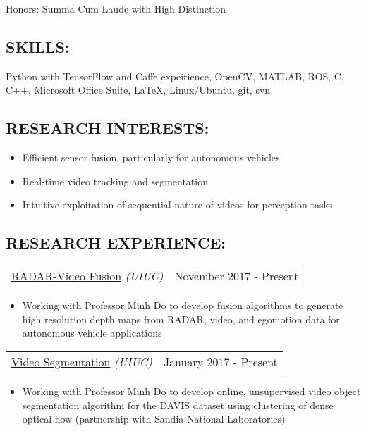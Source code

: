 \documentclass[10pt, letterpaper]{article}
\makeatletter
\newcommand{\headerrow}[2]
{\begin{tabular*}{\linewidth}{l@{\extracolsep{\fill}}r}
	#1 &
	#2 \\
\end{tabular*}}
\newcommand{\sansserif}{\cabin}
\makeatother
\begin{document}
Honors: Summa Cum Laude with High Distinction

\subsection*{\sansserif SKILLS:}
Python with TensorFlow and Caffe expeirience, OpenCV, MATLAB, ROS, C, C++,
	Microsoft Office Suite, \LaTeX, Linux/Ubuntu, git, svn

\subsection*{\sansserif RESEARCH INTERESTS:}
\begin{itemize}
	\item Efficient sensor fusion, particularly for autonomous vehicles
	\item Real-time video tracking and segmentation
	\item Intuitive exploitation of sequential nature of videos for perception tasks
\end{itemize}

\subsection*{\sansserif RESEARCH EXPERIENCE:}

\headerrow
    {\uline{RADAR-Video Fusion} \textit{(UIUC)}}
    {November 2017 - Present}
    \begin{itemize}
        \item
        Working with Professor Minh Do to develop fusion algorithms to generate high resolution depth maps from RADAR, video, and egomotion data for autonomous vehicle applications
    \end{itemize}

\headerrow
	{\uline{Video Segmentation} \textit{(UIUC)}}
	{January 2017 - Present}
	\begin{itemize}
		\item
		Working with Professor Minh Do to develop online, unsupervised video object segmentation algorithm for the DAVIS dataset using clustering of dense optical flow (partnership with Sandia National Laboratories)	
	\end{itemize}
\end{document}
